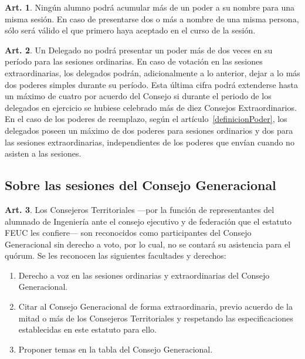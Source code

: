 \documentclass[letterpaper,11pt]{article}
\theoremstyle{definition}%
\newtheorem{art}{Art.} %
\begin{document}
\begin{art}\label{maxPoderesRecividos}
	Ningún alumno podrá acumular más de un poder a su nombre para una misma sesión. En caso de presentarse dos o más a nombre de una misma persona, sólo será válido el que primero haya aceptado en el curso de la sesión.
\end{art}

\begin{art}\label{maxPoderesEmitidos}
	Un Delegado no podrá presentar un poder más de dos veces en su período para las sesiones ordinarias. En caso de votación en las sesiones extraordinarias, los delegados podrán, adicionalmente a lo anterior, dejar a lo más dos poderes simples durante su período. Esta última cifra podrá extenderse hasta un máximo de cuatro por acuerdo del Consejo si durante el periodo de los delegados en ejercicio se hubiese celebrado más de diez Consejos Extraordinarios. En el caso de los poderes de reemplazo, según el artículo~\ref{definicionPoder}, los delegados poseen un máximo de dos poderes para sesiones ordinarios y dos para las sesiones extraordinarias, independientes de los poderes que envían cuando no asisten a las sesiones.
\end{art}

\subsection*{Sobre las sesiones del Consejo Generacional}

\begin{art}
	Los Consejeros Territoriales ---por la función de representantes del alumnado de Ingeniería ante el consejo ejecutivo y de federación que el estatuto FEUC les confiere--- son reconocidos como participantes del Consejo Generacional sin derecho a voto, por lo cual, no se contará su asistencia para el quórum. Se les reconocen las siguientes facultades y derechos:
	\begin{enumerate}
		\item Derecho a voz en las sesiones ordinarias y extraordinarias del Consejo Generacional.
		\item Citar al Consejo Generacional de forma extraordinaria, previo acuerdo de la mitad o más de los Consejeros Territoriales y respetando las especificaciones establecidas en este estatuto para ello.
		\item Proponer temas en la tabla del Consejo Generacional.
	\end{enumerate}
\end{art}
\end{document}
